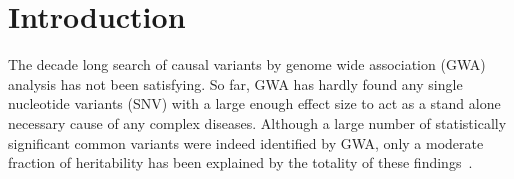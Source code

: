 \documentclass[11pt]{article}
\begin{document}
\section*{Introduction}

The decade long search of causal variants by genome wide association (GWA) analysis has not been satisfying. So far, GWA has hardly found any single nucleotide variants (SNV) with a large enough effect size to act as a stand alone necessary cause of any complex diseases. Although a large number of statistically significant common variants were indeed identified by GWA, only a moderate fraction of heritability has been explained by the totality of these findings~\citep{GWA1, GWA2}. %
\end{document}
